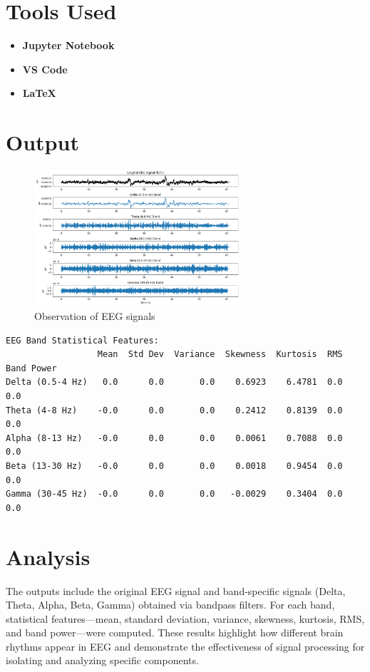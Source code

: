 \documentclass[a4paper,11pt]{article}
\begin{document}
\section*{Tools Used}
\begin{itemize}
    \item \textbf{Jupyter Notebook}
    \item \textbf{VS Code}
    \item \textbf{\LaTeX}
\end{itemize}

\section*{Output}
\begin{figure}[H]
    \centering
    \includegraphics[width=0.68\textwidth]{output.png}
    \caption{Observation of EEG signals}
    \label{fig:raw_eeg}
\end{figure}

\vspace{-1em}

\begin{verbatim}
EEG Band Statistical Features:
                  Mean  Std Dev  Variance  Skewness  Kurtosis  RMS  Band Power
Delta (0.5-4 Hz)   0.0      0.0       0.0    0.6923    6.4781  0.0         0.0
Theta (4-8 Hz)    -0.0      0.0       0.0    0.2412    0.8139  0.0         0.0
Alpha (8-13 Hz)   -0.0      0.0       0.0    0.0061    0.7088  0.0         0.0
Beta (13-30 Hz)   -0.0      0.0       0.0    0.0018    0.9454  0.0         0.0
Gamma (30-45 Hz)  -0.0      0.0       0.0   -0.0029    0.3404  0.0         0.0
\end{verbatim}


\section*{Analysis}
The outputs include the original EEG signal and band-specific signals (Delta, Theta, Alpha, Beta, Gamma) obtained via bandpass filters. For each band, statistical features—mean, standard deviation, variance, skewness, kurtosis, RMS, and band power—were computed. These results highlight how different brain rhythms appear in EEG and demonstrate the effectiveness of signal processing for isolating and analyzing specific components.
\end{document}
